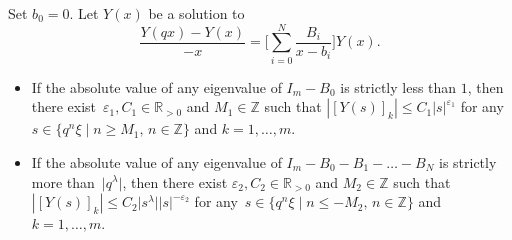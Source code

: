 \documentclass[10pt,a4paper]{amsart}
\begin{document}
\begin{Proposition} \label{prop:qcintconvYx}
Set $b_0=0$.
Let $Y(x)$ be a solution to
\begin{equation}
\frac{Y(q x) - Y(x )}{-x} = \Biggl[ \sum^{N}_{i = 0}\frac{B_{i}}{x -b_{i}} \Biggr] Y(x).
\label{eq:YqxBYx00}
\end{equation}
\begin{itemize}\itemsep=0pt
\item[$(i)$] If the absolute value of any eigenvalue of $I_m - B_0$ is strictly less than $1$, then there exist~${\varepsilon _1 , C_1 \in \mathbb{R}_{>0}} $ and $M_1 \in \mathbb{Z} $ such that $|[Y(s )]_k | \leq C_1 |s |^{\varepsilon _1} $ for any $s \in \{ q^{n}\xi \mid n \geq M_1 ,\, n \in \mathbb{Z} \} $ and $k=1,\dots ,m$.
\item[$(ii)$] If the absolute value of any eigenvalue of $I_m - B_0 -B_1 - \dots - B_N$ is strictly more than~$\big|q^{\lambda }\big|$, then there exist $\varepsilon _2 , C_2 \in \mathbb{R}_{>0} $ and $M_2 \in \mathbb{Z} $ such that $|[Y(s )]_k | \leq C_2 \big|s ^{\lambda }\big| |s | ^{ - \varepsilon _2}$ for any~${s \in \{ q^{n}\xi \mid n \leq -M_2 ,\, n \in \mathbb{Z} \} }$ and $k=1,\dots ,m$.
\end{itemize}
\end{Proposition}
\end{document}
